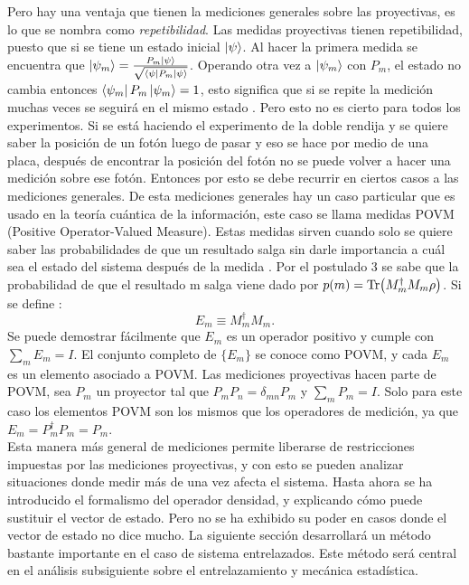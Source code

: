 Pero hay una ventaja que tienen  la mediciones generales sobre las proyectivas, es lo que se nombra como \textit{repetibilidad}. Las medidas proyectivas tienen repetibilidad, puesto que si se tiene un estado inicial $\ket{\psi}$. Al hacer la primera medida se encuentra que $\ket{\psi_{m}}=\frac{P_{m}\ket{\psi}}{\sqrt{\bra{\psi}P_{m}\ket{\psi}}}$. Operando otra vez a $\ket{\psi_{m}}$ con $P_{m}$, el estado no cambia entonces $\bra{\psi_{m}}P_{m}\ket{\psi_{m}}=1$, esto significa que si se repite la medición muchas veces se seguirá en el mismo estado \cite{VedralInformation}. Pero esto no es cierto para todos los experimentos. Si se está haciendo el experimento de la doble rendija y se quiere saber la posición de un fotón luego de pasar y eso se hace por medio de una placa, después de encontrar la posición del fotón no se puede volver a hacer una medición  sobre ese fotón. Entonces por esto se debe recurrir en ciertos casos a las mediciones generales. De esta mediciones generales hay un caso particular que es usado en la teoría cuántica de la información, este caso se llama medidas POVM (Positive Operator-Valued Measure). Estas medidas sirven cuando solo se quiere saber las probabilidades de que un resultado salga sin darle importancia a cuál sea el estado del sistema después de la medida \cite{NielsenInformation}.
Por el postulado 3 se sabe que la probabilidad de que el resultado m salga viene dado por $p(m)= \Tr (M^{\dagger}_{m}M_{m} \rho)$. Si se define :
\begin{equation}
E_{m} \equiv M^{\dagger}_{m}M_{m}.
\end{equation}
Se puede demostrar fácilmente que $E_{m}$ es un operador positivo y cumple con $\sum_{m} E_{m}=I$. El conjunto completo de $ \{ E_{m}\}$ se conoce como POVM, y cada $E_{m}$ es un elemento asociado a POVM. Las mediciones proyectivas hacen parte de POVM, sea $P_{m}$ un proyector tal que $P_{m}P_{n}= \delta_{mn}P_{m}$ y $\sum_{m}P_{m}=I$. Solo para este caso los elementos POVM son los mismos que los operadores de medición, ya que $E_{m}=P_{m}^{\dagger}P_{m}=P_{m}$.
\\
Esta manera más general de mediciones permite liberarse de restricciones impuestas por las mediciones proyectivas, y con esto se pueden analizar situaciones donde medir más de una vez afecta el sistema. Hasta ahora se ha introducido el formalismo del operador densidad, y explicando cómo puede sustituir el vector de estado. Pero no se ha exhibido su poder en casos donde el vector de estado no dice mucho. La siguiente sección desarrollará un método bastante importante en el caso de sistema entrelazados. Este método será central en el análisis subsiguiente sobre el entrelazamiento y mecánica estadística.

